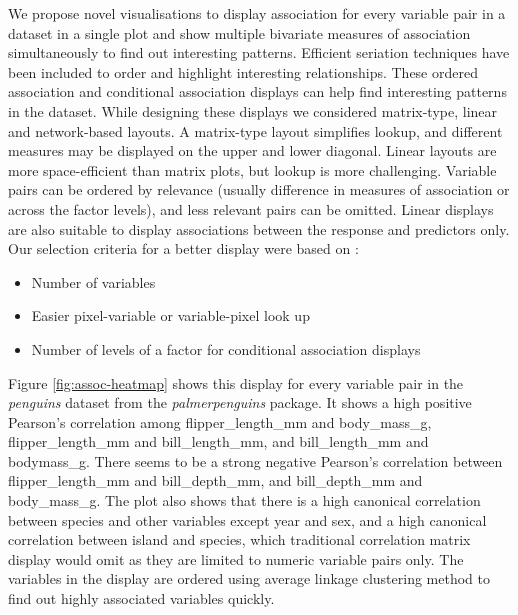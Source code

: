We propose novel visualisations to display association for every
variable pair in a dataset in a single plot and show multiple bivariate
measures of association simultaneously to find out interesting patterns.
Efficient seriation techniques have been included to order and highlight
interesting relationships. These ordered association and conditional
association displays can help find interesting patterns in the dataset.
While designing these displays we considered matrix-type, linear and
network-based layouts. A matrix-type layout simplifies lookup, and
different measures may be displayed on the upper and lower diagonal.
Linear layouts are more space-efficient than matrix plots, but lookup is
more challenging. Variable pairs can be ordered by relevance (usually
difference in measures of association or across the factor levels), and
less relevant pairs can be omitted. Linear displays are also suitable to
display associations between the response and predictors only. Our
selection criteria for a better display were based on :

\begin{itemize}
\item Number of variables
\item Easier pixel-variable or variable-pixel
look up
\item Number of levels of a factor for conditional association displays
\end{itemize}

Figure \ref{fig:assoc-heatmap} shows this display for every variable
pair in the \emph{penguins} dataset from the \emph{palmerpenguins}
package. It shows a high positive Pearson's correlation among
flipper\_length\_mm and body\_mass\_g, flipper\_length\_mm and
bill\_length\_mm, and bill\_length\_mm and bodymass\_g. There seems to
be a strong negative Pearson's correlation between flipper\_length\_mm
and bill\_depth\_mm, and bill\_depth\_mm and body\_mass\_g. The plot
also shows that there is a high canonical correlation between species
and other variables except year and sex, and a high canonical
correlation between island and species, which traditional correlation
matrix display would omit as they are limited to numeric variable pairs
only. The variables in the display are ordered using average linkage
clustering method to find out highly associated variables quickly.

